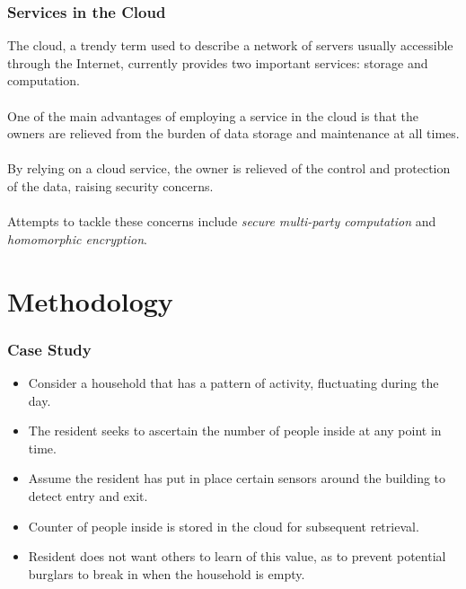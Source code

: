 \documentclass{beamer}
\begin{document}
\begin{frame}
\frametitle{Services in the Cloud}
The cloud, a trendy term used to describe a network of servers usually accessible through the Internet, currently provides two important services: storage and computation. \\~\\

One of the main advantages of employing a service in the cloud is that the owners are relieved from the burden of data storage and maintenance at all times. \\~\\

By relying on a cloud service, the owner is relieved of the control and protection of the data, raising security concerns. \\~\\

Attempts to tackle these concerns include \emph{secure multi-party computation} and \emph{homomorphic encryption}. 
\end{frame}
\section{Methodology}
\begin{frame}
\frametitle{Case Study}

\begin{itemize}
  \setlength\itemsep{1.5em}
\item Consider a household that has a pattern of activity, fluctuating during the day.
\item The resident seeks to ascertain the number of people inside at any point in time.
\item Assume the resident has put in place certain sensors around the building to detect entry and exit.
\item Counter of people inside is stored in the cloud for subsequent retrieval. 
\item Resident does not want others to learn of this value, as to prevent potential burglars to break in when the household is empty.
\end{itemize}
\end{frame}

\end{document}
